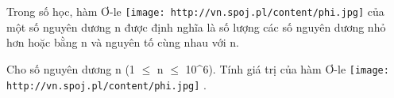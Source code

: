 Trong số học, hàm Ơ-le   
\texttt{[image: http://vn.spoj.pl/content/phi.jpg]}   của một số nguyên dương n được định nghĩa là số lượng các số nguyên dương nhỏ hơn hoặc bằng n và nguyên tố cùng nhau với n.  

   Cho số nguyên dương n (1  $\le$  n  $\le$  10^6). Tính giá trị của hàm Ơ-le   
\texttt{[image: http://vn.spoj.pl/content/phi.jpg]}   .